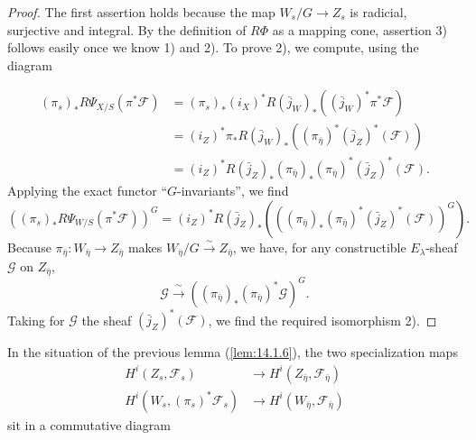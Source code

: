 \begin{proof}
The first assertion holds because the map $W_s/G \to Z_s$ is radicial, surjective and integral. By the definition of $R\Phi$ as a mapping cone, assertion 3) follows easily once we know 1) and 2). To prove 2), we compute, using the diagram
\begin{center}
\end{center}
\begin{align*}
(\pi_s)_* R\Psi_{X/S}(\pi^*\mathcal{F}) &= (\pi_s)_* (i_X)^* R(\bar{j}_W)_* ((\bar{j}_W)^*\pi^*\mathcal{F}) \\
&= (i_Z)^* \pi_* R(\bar{j}_W)_* ((\pi_{\bar{\eta}})^* (\bar{j}_Z)^*(\mathcal{F})) \\
&= (i_Z)^* R(\bar{j}_Z)_* (\pi_{\bar{\eta}})_* (\pi_{\bar{\eta}})^* (\bar{j}_Z)^*(\mathcal{F}) .
\end{align*}
Applying the exact functor ``$G$-invariants'', we find
\[
((\pi_s)_* R\Psi_{W/S}(\pi^*\mathcal{F}))^G = (i_Z)^* R(\bar{j}_Z)_* (((\pi_{\bar{\eta}})_* (\pi_{\bar{\eta}})^* (\bar{j}_Z)^*(\mathcal{F}))^G) .
\]
Because $\pi_{\bar{\eta}} : W_{\bar{\eta}} \to Z_{\bar{\eta}}$ makes $W_{\bar{\eta}}/G \xrightarrow{\sim} Z_{\bar{\eta}}$, we have, for any constructible $E_\lambda$-sheaf $\mathcal{G}$ on $Z_{\bar{\eta}}$,
\[
\mathcal{G} \xrightarrow{\ \sim\ } ((\pi_{\bar{\eta}})_* (\pi_{\bar{\eta}})^* \mathcal{G})^G .
\]
Taking for $\mathcal{G}$ the sheaf $(\bar{j}_Z)^*(\mathcal{F})$, we find the required isomorphism 2).
\end{proof}

\begin{kcor}\label{cor:14.1.7}
In the situation of the previous lemma (\ref{lem:14.1.6}), the two specialization maps
\begin{align*}
H^i(Z_s, \mathcal{F}_s) &\to H^i(Z_{\bar{\eta}}, \mathcal{F}_{\bar{\eta}}) \\
H^i(W_s, (\pi_s)^*\mathcal{F}_s) &\to H^i(W_{\bar{\eta}}, \mathcal{F}_{\bar{\eta}})
\end{align*}
sit in a commutative diagram
\begin{center}
\end{center}
\end{kcor}

